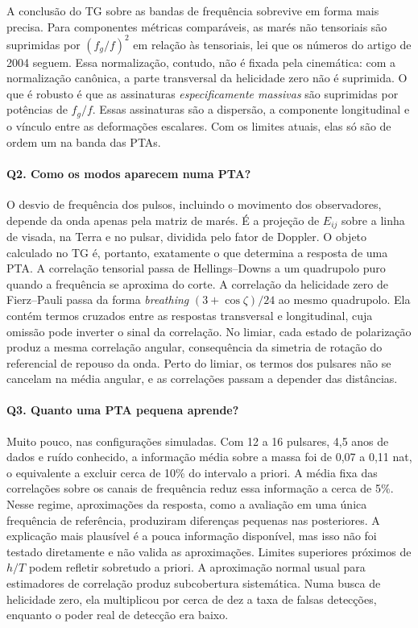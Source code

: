 A conclusão do TG sobre as bandas de frequência sobrevive em forma mais
precisa. Para componentes métricas comparáveis, as marés não tensoriais
são suprimidas por $(f_g/f)^2$ em relação às tensoriais, lei que os
números do artigo de 2004 seguem. Essa normalização, contudo, não é
fixada pela cinemática: com a normalização canônica, a parte transversal
da helicidade zero não é suprimida. O que é robusto é que as assinaturas
\emph{especificamente massivas} são suprimidas por potências de $f_g/f$.
Essas assinaturas são a dispersão, a componente longitudinal e o vínculo
entre as deformações escalares. Com os limites atuais, elas só são de
ordem um na banda das PTAs.

\paragraph{Q2. Como os modos aparecem numa PTA?} O desvio de frequência
dos pulsos, incluindo o movimento dos observadores, depende da onda
apenas pela matriz de marés. É a projeção de $E_{ij}$ sobre a linha de
visada, na Terra e no pulsar, dividida pelo fator de Doppler. O objeto
calculado no TG é, portanto, exatamente o que determina a resposta de
uma PTA. A correlação tensorial passa de Hellings--Downs a um quadrupolo
puro quando a frequência se aproxima do corte. A correlação da
helicidade zero de Fierz--Pauli passa da forma \emph{breathing}
$(3+\cos\zeta)/24$ ao mesmo quadrupolo. Ela contém termos cruzados entre
as respostas transversal e longitudinal, cuja omissão pode inverter o
sinal da correlação. No limiar, cada estado de polarização produz a
mesma correlação angular, consequência da simetria de rotação do
referencial de repouso da onda. Perto do limiar, os termos dos pulsares
não se cancelam na média angular, e as correlações passam a depender
das distâncias.

\paragraph{Q3. Quanto uma PTA pequena aprende?} Muito pouco, nas
configurações simuladas. Com 12 a 16 pulsares, 4,5 anos de dados e ruído
conhecido, a informação média sobre a massa foi de 0,07 a 0,11 nat, o
equivalente a excluir cerca de 10\% do intervalo a priori. A média fixa
das correlações sobre os canais de frequência reduz essa informação a
cerca de 5\%. Nesse regime, aproximações da resposta, como a avaliação
em uma única frequência de referência, produziram diferenças pequenas
nas posteriores. A explicação mais plausível é a pouca informação
disponível, mas isso não foi testado diretamente e não valida as
aproximações. Limites superiores próximos de $h/T$ podem
refletir sobretudo a priori. A aproximação normal usual para
estimadores de correlação produz subcobertura sistemática. Numa busca
de helicidade zero, ela multiplicou por cerca de dez a taxa de falsas
detecções, enquanto o poder real de detecção era baixo.

